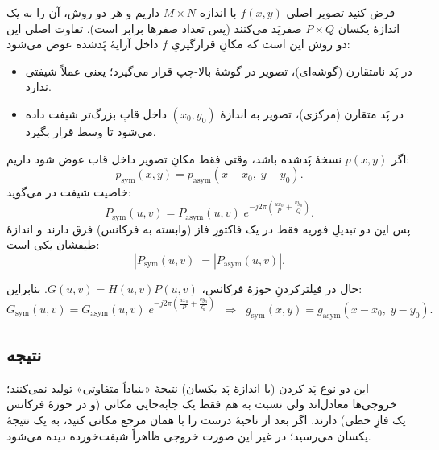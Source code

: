 فرض کنید تصویر اصلی $f(x,y)$ با اندازه $M\times N$ داریم و هر دو روش، آن را به یک اندازهٔ یکسان $P\times Q$ صفرپَد می‌کنند (پس تعداد صفرها برابر است). تفاوت اصلی این دو روش این است که مکانِ قرارگیریِ $f$ داخل آرایهٔ پَدشده عوض می‌شود:

\begin{itemize}
\item در پَد نامتقارن (گوشه‌ای)، تصویر در گوشهٔ بالا-چپ قرار می‌گیرد؛ یعنی عملاً شیفتی ندارد.
\item در پَد متقارن (مرکزی)، تصویر به اندازهٔ $(x_0,y_0)$ داخل قابِ بزرگ‌تر شیفت داده می‌شود تا وسط قرار بگیرد.
\end{itemize}

اگر $p(x,y)$ نسخهٔ پَدشده باشد، وقتی فقط مکانِ تصویر داخل قاب عوض شود داریم:
$$
p_{\text{sym}}(x,y)=p_{\text{asym}}(x-x_0,\;y-y_0).
$$
خاصیت شیفت در  می‌گوید:
$$
P_{\text{sym}}(u,v)=P_{\text{asym}}(u,v)\;e^{-j2\pi\left(\frac{ux_0}{P}+\frac{vy_0}{Q}\right)}.
$$
پس این دو تبدیلِ فوریه فقط در یک فاکتورِ فاز (وابسته به فرکانس) فرق دارند و اندازهٔ طیفشان یکی است:
$$
|P_{\text{sym}}(u,v)|=|P_{\text{asym}}(u,v)|.
$$

حال در فیلترکردنِ حوزهٔ فرکانس، $G(u,v)=H(u,v)P(u,v)$.
بنابراین:
$$
G_{\text{sym}}(u,v)=G_{\text{asym}}(u,v)\;e^{-j2\pi\left(\frac{ux_0}{P}+\frac{vy_0}{Q}\right)}
\;\;\Longrightarrow\;\;
g_{\text{sym}}(x,y)=g_{\text{asym}}(x-x_0,\;y-y_0).
$$

\subsection*{نتیجه}
این دو نوع پَد کردن (با اندازهٔ پَد یکسان) نتیجهٔ «بنیاداً متفاوتی» تولید نمی‌کنند؛ خروجی‌ها معادل‌اند ولی نسبت به هم فقط یک جابه‌جایی مکانی (و در حوزهٔ فرکانس یک فازِ خطی) دارند. اگر بعد از  ناحیهٔ درست را با همان مرجع مکانی  کنید، به یک نتیجهٔ یکسان می‌رسید؛ در غیر این صورت خروجی ظاهراً شیفت‌خورده دیده می‌شود.